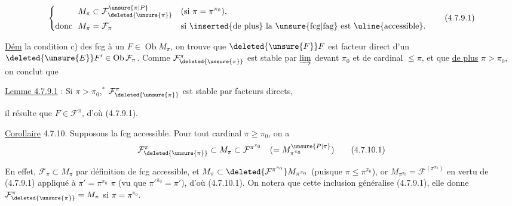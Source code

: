 \[
\left\{\begin{aligned}
M_{\pi}&\subset\mathcal F^{\unsure{\pi|P}}_{\deleted{\unsure{\pi}}}
  &&(\text{si }\pi=\pi^{\pi_0}),\\
\text{donc }\ M_{\pi}&=\mathcal F_{\pi}
  &&\text{si \inserted{de plus} la \unsure{fcg|fag} est \uline{accessible}.}
\end{aligned}\right.
\tag*{(4.7.9.1)}
\]

\uline{Dém}  la condition c) des fcg à
un $F\in\operatorname{Ob}M_\pi$, on trouve que $\deleted{\unsure{F}}F$ est facteur
direct d'un $\deleted{\unsure{E}}F'\in\operatorname{Ob}\mathcal F_\pi$. Comme $\mathcal F^\pi_{\deleted{\unsure{\pi}}}$ est
stable par $\varinjlim$  devant $\pi_0$ et de cardinal
$\leq\pi$, et que \uline{de plus} $\pi>\pi_0$, on conclut que

\uline{Lemme 4.7.9.1} : Si $\pi>\pi_0$,$^{*}$ $\mathcal F^\pi_{\deleted{\unsure{\pi}}}$ est stable par
facteurs directs,

il résulte que $F\in\mathcal F^\pi$, d'où (4.7.9.1).

\uline{Corollaire} 4.7.10. Supposons la fcg accessible.
Pour tout cardinal $\pi\geq\pi_0$, on a
\[
\mathcal F^\pi_{\deleted{\unsure{\pi}}}\subset M_\pi\subset\mathcal F^{\pi^{\pi_0}}
\quad(=M^{\unsure{P|\pi}}_{\pi^{\pi_0}})
\tag*{(4.7.10.1)}
\]

En effet, $\mathcal F_\pi\subset M_\pi$ par définition de fcg
accessible, et $M_\pi\subset\deleted{\mathcal F^{\pi^{\pi_0}}}M_{\pi^{\pi_0}}$ (puisque
$\pi\leq\pi^{\pi_0}$), or $M_{\pi^{\pi_0}}=\mathcal F^{(\pi^{\pi_0})}$ en vertu de
(4.7.9.1) appliqué à $\pi'=\pi^{\pi_0}$  $\pi$ (vu que
$\pi'^{\pi_0}=\pi'$), d'où (4.7.10.1). On notera
que cette inclusion généralise (4.7.9.1),
elle donne $\mathcal F^\pi_{\deleted{\unsure{\pi}}}=M_\pi$ si $\pi=\pi^{\pi_0}$.

